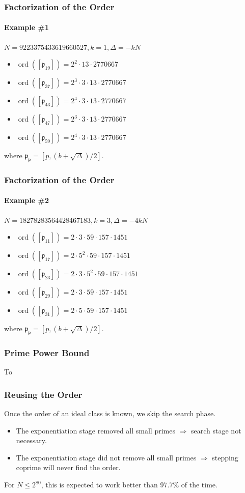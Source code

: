 \documentclass{beamer}
\DeclareMathOperator{\ord}{ord}
\newcommand{\ideal}{\mathfrak}
\newcommand{\idealclass}[1]{\left[ \ideal #1 \right]}
\begin{document}
\begin{frame}
\frametitle{Factorization of the Order}
\framesubtitle{Example \#1}

$N = 9223375433619660527, k = 1, \Delta = -kN$
\begin{itemize}
\item $\ord(\idealclass{p_{19}}) = 2^2 \cdot 13 \cdot 2770667$
\item $\ord(\idealclass{p_{37}}) = 2^3 \cdot 3 \cdot 13 \cdot 2770667$
\item $\ord(\idealclass{p_{43}}) = 2^4 \cdot 3 \cdot 13 \cdot 2770667$
\item $\ord(\idealclass{p_{47}}) = 2^3 \cdot 3 \cdot 13 \cdot 2770667$
\item $\ord(\idealclass{p_{59}}) = 2^4 \cdot 3 \cdot 13 \cdot 2770667$
\end{itemize}

where $\ideal{p_p} = [p, (b + \sqrt\Delta)/2]$.

\end{frame}

\begin{frame}
\frametitle{Factorization of the Order}
\framesubtitle{Example \#2}

$N = 18278283564428467183, k = 3, \Delta = -4kN$
\begin{itemize}
\item $\ord(\idealclass{p_{11}}) = 2 \cdot 3 \cdot 59 \cdot 157 \cdot 1451$
\item $\ord(\idealclass{p_{17}}) = 2 \cdot 5^2 \cdot 59 \cdot 157 \cdot 1451$
\item $\ord(\idealclass{p_{23}}) = 2 \cdot 3 \cdot 5^2 \cdot 59 \cdot 157 \cdot 1451$
\item $\ord(\idealclass{p_{29}}) = 2 \cdot 3 \cdot 59 \cdot 157 \cdot 1451$
\item $\ord(\idealclass{p_{31}}) = 2 \cdot 5 \cdot 59 \cdot 157 \cdot 1451$

\end{itemize}

where $\ideal{p_p} = [p, (b + \sqrt\Delta)/2]$.

\end{frame}

\begin{frame}
\frametitle{Prime Power Bound}
To 

\end{frame}

\begin{frame}
\frametitle{Reusing the Order}

Once the order of an ideal class is known, we skip the search phase.

\begin{itemize}
\item The exponentiation stage removed all small primes $\Rightarrow$ search stage not necessary.

\item The exponentiation stage did not remove all small primes $\Rightarrow$ stepping coprime will never find the order.
\end{itemize}

For $N \le 2^{80}$, this is expected to work better than 97.7\% of the time.

\end{frame}
\end{document}
